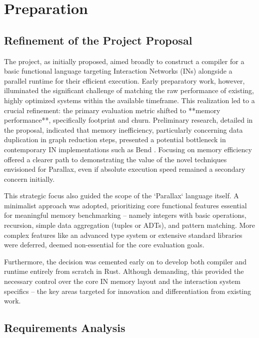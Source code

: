 \chapter{Preparation}

\section{Refinement of the Project Proposal} %

The project, as initially proposed, aimed broadly to construct a compiler for a basic functional language targeting Interaction Networks (INs) alongside a parallel runtime for their efficient execution. Early preparatory work, however, illuminated the significant challenge of matching the raw performance of existing, highly optimized systems within the available timeframe. This realization led to a crucial refinement: the primary evaluation metric shifted to **memory performance**, specifically footprint and churn. Preliminary research, detailed in the proposal, indicated that memory inefficiency, particularly concerning data duplication in graph reduction steps, presented a potential bottleneck in contemporary IN implementations such as Bend \cite{bend}. Focusing on memory efficiency offered a clearer path to demonstrating the value of the novel techniques envisioned for Parallax, even if absolute execution speed remained a secondary concern initially.

This strategic focus also guided the scope of the `Parallax` language itself. A minimalist approach was adopted, prioritizing core functional features essential for meaningful memory benchmarking – namely integers with basic operations, recursion, simple data aggregation (tuples or ADTs), and pattern matching. More complex features like an advanced type system or extensive standard libraries were deferred, deemed non-essential for the core evaluation goals.

Furthermore, the decision was cemented early on to develop both compiler and runtime entirely from scratch in Rust. Although demanding, this provided the necessary control over the core IN memory layout and the interaction system specifics – the key areas targeted for innovation and differentiation from existing work.

\section{Requirements Analysis} %

